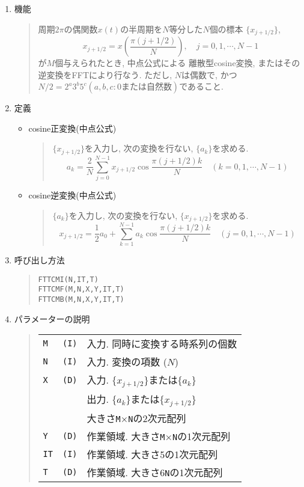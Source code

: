 \documentclass[a4j]{jarticle}
\newcommand{\ttM}{{\tt M}}
\newcommand{\ttN}{{\tt N}}
\begin{document}
\begin{enumerate}

  \item 機能 
  \begin{quote}
    周期$2\pi$の偶関数$x(t)$の半周期を$N$等分した$N$個の標本
    $\{x_{j+1/2}\}$,
     $$x_{j+1/2}=x(\frac{\pi(j+1/2)}N), \quad j=0,1,\cdots,N-1 $$
    が$M$個与えられたとき, 中点公式による
    離散型cosine変換, またはその逆変換をFFTにより行なう. ただし, 
    $N$は偶数で, かつ$N/2=2^a3^b5^c(a,b,c: 0または自然数)$であること.
  \end{quote}

  \item 定義
    \begin{itemize}
     \item cosine正変換(中点公式)
      \begin{quote}
       $\{x_{j+1/2}\}$を入力し, 次の変換を行ない, $\{a_k\}$を求める.
       $$a_k= \frac2N
              \sum^{N-1}_{j=0}x_{j+1/2}\cos\frac{\pi(j+1/2)k}N
       \quad (k=0,1,\cdots,N-1)$$
      \end{quote}

     \item cosine逆変換(中点公式)
      \begin{quote}
       $\{a_k\}$を入力し, 次の変換を行ない, $\{x_{j+1/2}\}$を求める.
       $$x_{j+1/2}=\frac12 a_0
              +\sum^{N-1}_{k=1}a_k\cos\frac{\pi(j+1/2)k}N
       \quad (j=0,1,\cdots,N-1)$$
      \end{quote}
     \end{itemize}    

  \item 呼び出し方法 
  \begin{quote}
    {\tt FTTCMI(N,IT,T)}\\
    {\tt FTTCMF(M,N,X,Y,IT,T)}\\
    {\tt FTTCMB(M,N,X,Y,IT,T)}
  \end{quote}
  \item パラメーターの説明 
  \begin{quote}
    \begin{tabular}{llp{10cm}}
      {\tt M }&{\tt (I)}& 入力. 同時に変換する時系列の個数\\
      {\tt N }&{\tt (I)}& 入力. 変換の項数 ($N$)\\
      {\tt X }   & {\tt (D)} & 入力. $\{x_{j+1/2}\}$または$\{a_k\}$\\
                 &           & 出力. $\{a_k\}$または$\{x_{j+1/2}\}$\\
                 &           & 大きさ\ttM$\times$\ttN の2次元配列\\
      {\tt Y }   & {\tt (D)} & 作業領域. 大きさ\ttM$\times$\ttN の1次元配列\\
      {\tt IT}   & {\tt (I)} & 作業領域. 大きさ5の1次元配列\\
      {\tt T }   & {\tt (D)} & 作業領域. 大きさ6\ttN の1次元配列
    \end{tabular}
  \end{quote}


\end{enumerate}
\end{document}
